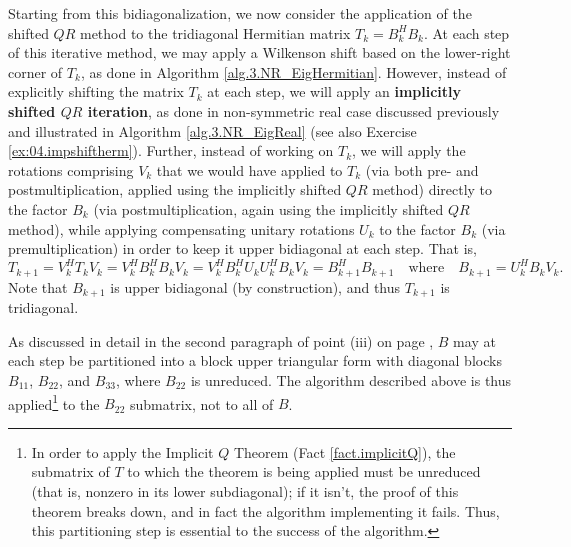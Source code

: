 \begin{figure*}[t]
\end{figure*}

Starting from this bidiagonalization, we now consider the application of the shifted $QR$ method to the
tridiagonal Hermitian matrix $T_k=B_k^H B_k$.  At each step of this iterative method, we may apply a Wilkenson shift based on the lower-right corner of $T_k$,
as done in Algorithm \ref{alg.3.NR_EigHermitian}.  However, instead of explicitly shifting the matrix $T_k$ at each step, we will apply an {\bf implicitly shifted $QR$ iteration},
as done in non-symmetric real case discussed previously and illustrated in Algorithm \ref{alg.3.NR_EigReal} (see also Exercise \ref{ex:04.impshiftherm}).
Further, instead of working on $T_k$, we will apply the rotations comprising $V_k$ that we would have applied to $T_k$ (via both pre- and postmultiplication, applied using the implicitly shifted $QR$ method)
directly to the factor $B_k$ (via postmultiplication, again using the implicitly shifted $QR$ method), while applying compensating unitary rotations $U_k$ to the factor $B_k$
(via premultiplication) in order to keep it upper bidiagonal at each step.
That is,
\begin{equation*}
T_{k+1}=V_k^H T_k V_k = V_k^H B_k^H B_k V_k =  V_k^H B_k^H U_k U_k^H B_k V_k = B_{k+1}^H B_{k+1} \quad\textrm{where}\quad B_{k+1}=U_k^H B_k V_k.
\end{equation*}
Note that $B_{k+1}$ is upper bidiagonal (by construction), and thus $T_{k+1}$ is tridiagonal.  

As discussed in detail in the second paragraph of point (iii) on page \pageref{par:T22isolation}, $B$ may at each step be partitioned into a block upper triangular form
with diagonal blocks $B_{11}$, $B_{22}$, and $B_{33}$, where $B_{22}$ is unreduced.  The algorithm described above is thus
applied\footnote{In order to apply the Implicit $Q$ Theorem (Fact \ref{fact.implicitQ}), the submatrix of $T$ to which the theorem is being applied must be unreduced
(that is, nonzero in its lower subdiagonal); if it isn't, the proof
of this theorem breaks down, and in fact the algorithm implementing it fails. Thus, this partitioning step is essential to the success of the algorithm.}
to the $B_{22}$ submatrix, not to all of $B$.

